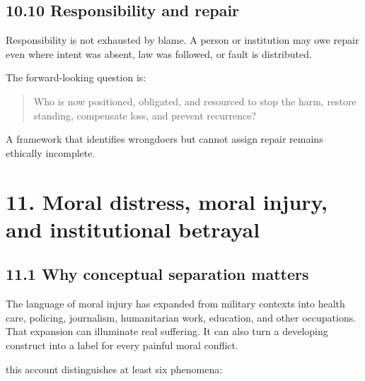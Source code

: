 \documentclass[
  11pt,
]{article}
\begin{document}
\subsection{10.10 Responsibility and
repair}\label{responsibility-and-repair}

Responsibility is not exhausted by blame. A person or institution may
owe repair even where intent was absent, law was followed, or fault is
distributed.

The forward-looking question is:

\begin{quote}
Who is now positioned, obligated, and resourced to stop the harm,
restore standing, compensate loss, and prevent recurrence?
\end{quote}

A framework that identifies wrongdoers but cannot assign repair remains
ethically incomplete.

\section{11. Moral distress, moral injury, and institutional
betrayal}\label{moral-distress-moral-injury-and-institutional-betrayal}

\subsection{11.1 Why conceptual separation
matters}\label{why-conceptual-separation-matters}

The language of moral injury has expanded from military contexts into
health care, policing, journalism, humanitarian work, education, and
other occupations. That expansion can illuminate real suffering. It can
also turn a developing construct into a label for every painful moral
conflict.

this account distinguishes at least six phenomena:
\end{document}
